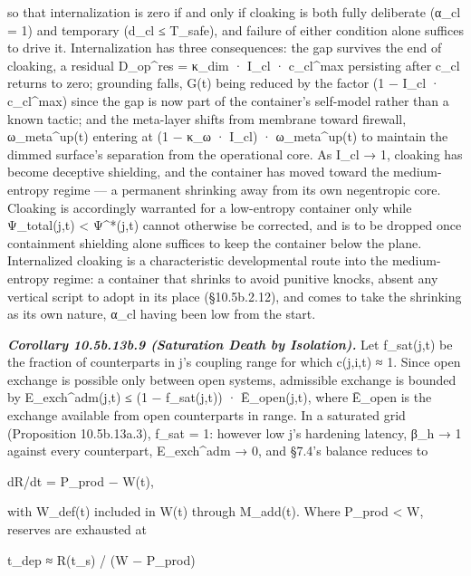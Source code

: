 \documentclass[
]{article}
\begin{document}
so that internalization is zero if and only if cloaking is both fully
deliberate (α\_cl = 1) and temporary (d\_cl ≤ T\_safe), and failure of
either condition alone suffices to drive it. Internalization has three
consequences: the gap survives the end of cloaking, a residual
D\_op\^{}res = κ\_dim · I\_cl · c\_cl\^{}max persisting after c\_cl
returns to zero; grounding falls, G(t) being reduced by the factor (1 −
I\_cl · c\_cl\^{}max) since the gap is now part of the container's
self-model rather than a known tactic; and the meta-layer shifts from
membrane toward firewall, ω\_meta\^{}up(t) entering at (1 − κ\_ω ·
I\_cl) · ω\_meta\^{}up(t) to maintain the dimmed surface's separation
from the operational core. As I\_cl → 1, cloaking has become deceptive
shielding, and the container has moved toward the medium-entropy regime
--- a permanent shrinking away from its own negentropic core. Cloaking
is accordingly warranted for a low-entropy container only while
Ψ\_total(j,t) \textless{} Ψ\^{}*(j,t) cannot otherwise be corrected, and
is to be dropped once containment shielding alone suffices to keep the
container below the plane. Internalized cloaking is a characteristic
developmental route into the medium-entropy regime: a container that
shrinks to avoid punitive knocks, absent any vertical script to adopt in
its place (§10.5b.2.12), and comes to take the shrinking as its own
nature, α\_cl having been low from the start.

\emph{\textbf{Corollary 10.5b.13b.9 (Saturation Death by Isolation).}}
Let f\_sat(j,t) be the fraction of counterparts in j's coupling range
for which c(j,i,t) ≈ 1. Since open exchange is possible only between
open systems, admissible exchange is bounded by E\_exch\^{}adm(j,t) ≤ (1
− f\_sat(j,t)) · Ē\_open(j,t), where Ē\_open is the exchange available
from open counterparts in range. In a saturated grid (Proposition
10.5b.13a.3), f\_sat = 1: however low j's hardening latency, β\_h → 1
against every counterpart, E\_exch\^{}adm → 0, and §7.4's balance
reduces to

dR/dt = P\_prod − W(t),

with W\_def(t) included in W(t) through M\_add(t). Where P\_prod
\textless{} W, reserves are exhausted at

t\_dep ≈ R(t\_s) / (W − P\_prod)
\end{document}
